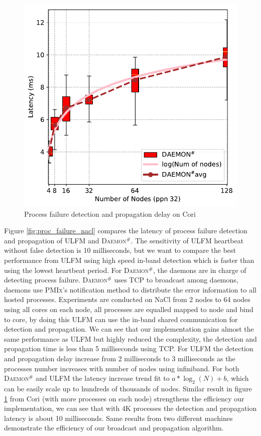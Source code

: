 \documentclass[sigconf]{acmart}
\newcommand{\pmix}[0]{\textsc{PMIx}\xspace}
\newcommand{\ulfm}[0]{\textsc{ULFM}\xspace}
\newcommand{\ourwork}[0]{\textsc{Daemon}\ensuremath{^\#}\xspace}
\begin{document}
\begin{figure}[h]
  \centering
  \includegraphics[width=\linewidth]{Cori_Process_Failure_fit.pdf}
  \caption{Process failure detection and propagation delay on Cori}
  \label{fig:proc_failure_cori}
\end{figure}

Figure \ref{fig:proc_failure_nacl} compares the latency of process failure detection and propagation of \ulfm and \ourwork. The sensitivity of \ulfm heartbeat without false detection is 10 milliseconds, but we want to compare the best performance from \ulfm using high speed in-band detection which is faster than using the lowest heartbeat period. For \ourwork, the daemons are in charge of detecting process failure. \ourwork uses TCP to broadcast among daemons, daemons use \pmix's notification method to distribute the error information to all hosted processes. Experiments are conducted on NaCl from 2 nodes to 64 nodes using all cores on each node, all processes are equalled mapped to node and bind to core, by doing this \ulfm can use the in-band shared communication for detection and propagation. We can see that our implementation gains almost the same performance as \ulfm but highly reduced the complexity, the detection and propagation time is less than 5 milliseconds using TCP. For \ulfm the detection and propagation delay increase from 2 milliseconds to 3 milliseconds as the processes number increases with number of nodes using infiniband. For both \ourwork and \ulfm the latency increase trend fit to $ a*\log_2(N) + b $, which can be easily scale up to hundreds of thousands of nodes. Similar result in figure \ref{fig:proc_failure_cori} from Cori (with more processes on each node) strengthens the efficiency our implementation, we can see that with 4K processes the detection and propagation latency is about 10 milliseconds. Same results from two different machines demonstrate the efficiency of our broadcast and propagation algorithm.  
\end{document}
